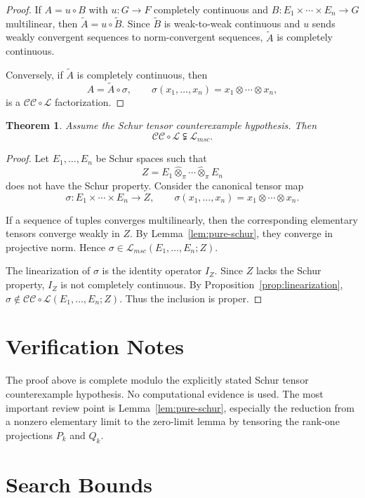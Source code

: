 \documentclass[11pt]{amsart}
\newtheorem{theorem}{Theorem}
\newcommand{\CC}{\mathcal{CC}}
\newcommand{\LLL}{\mathcal{L}}
\newcommand{\Lmsc}{\mathcal{L}_{msc}}
\newcommand{\tensorpi}{\widehat{\otimes}_{\pi}}
\begin{document}
\begin{proof}
If \(A=u\circ B\) with \(u:G\to F\) completely continuous and
\(B:E_1\times\cdots\times E_n\to G\) multilinear, then
\(\widetilde A=u\circ\widetilde B\). Since \(\widetilde B\) is weak-to-weak
continuous and \(u\) sends weakly convergent sequences to norm-convergent
sequences, \(\widetilde A\) is completely continuous.

Conversely, if \(\widetilde A\) is completely continuous, then
\[
  A=\widetilde A\circ\sigma,
  \qquad
  \sigma(x_1,\ldots,x_n)=x_1\otimes\cdots\otimes x_n,
\]
is a \(\CC\circ\LLL\) factorization.
\end{proof}

\begin{theorem}\label{thm:conditional}
Assume the Schur tensor counterexample hypothesis. Then
\[
  \CC\circ\LLL \subsetneqq \Lmsc.
\]
\end{theorem}

\begin{proof}
Let \(E_1,\ldots,E_n\) be Schur spaces such that
\[
  Z=E_1\tensorpi\cdots\tensorpi E_n
\]
does not have the Schur property. Consider the canonical tensor map
\[
  \sigma:E_1\times\cdots\times E_n\to Z,\qquad
  \sigma(x_1,\ldots,x_n)=x_1\otimes\cdots\otimes x_n.
\]

If a sequence of tuples converges multilinearly, then the corresponding
elementary tensors converge weakly in \(Z\). By Lemma~\ref{lem:pure-schur},
they converge in projective norm. Hence \(\sigma\in\Lmsc(E_1,\ldots,E_n;Z)\).

The linearization of \(\sigma\) is the identity operator \(I_Z\). Since \(Z\)
lacks the Schur property, \(I_Z\) is not completely continuous. By
Proposition~\ref{prop:linearization}, \(\sigma\notin
\CC\circ\LLL(E_1,\ldots,E_n;Z)\). Thus the inclusion is proper.
\end{proof}

\section*{Verification Notes}

The proof above is complete modulo the explicitly stated Schur tensor
counterexample hypothesis. No computational evidence is used. The most
important review point is Lemma~\ref{lem:pure-schur}, especially the reduction
from a nonzero elementary limit to the zero-limit lemma by tensoring the
rank-one projections \(P_k\) and \(Q_k\).

\section*{Search Bounds}
\end{document}
